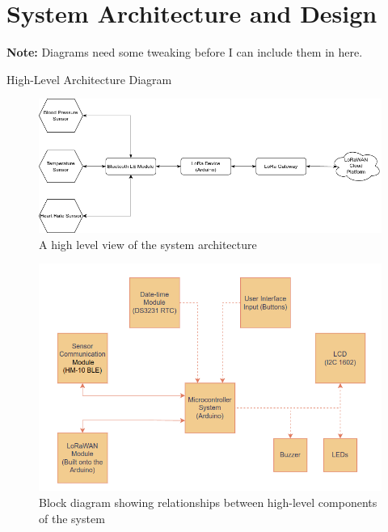 \section{System Architecture and Design} %
\textbf{Note:} Diagrams need some tweaking before I can include them in here.

High-Level Architecture Diagram

\begin{figure}[H]
\centering
\includegraphics[scale=0.5]{diagrams/high_level_architecture}
\caption{A high level view of the system architecture}
\label{fig:high_level_architecture_diagram}
\end{figure}

\begin{figure}[H]
\centering
\includegraphics[scale=0.8]{diagrams/block_diagram}
\caption{Block diagram showing relationships between high-level components of the system}
\label{fig:block_diagram}
\end{figure}

